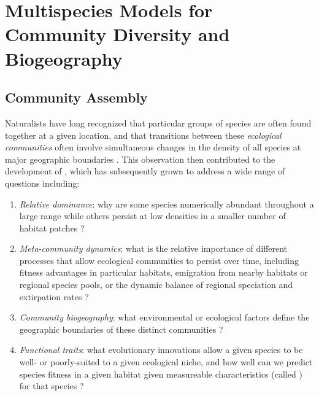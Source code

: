 \chapter{Multispecies Models for Community Diversity and Biogeography}\label{sec:Chap11_joint}

\section{Community Assembly} \label{sec:Chap11_community_assembly}

Naturalists have long recognized that particular groups of species are often found together at a given location, and that transitions between these \textit{ecological communities} often involve simultaneous changes in the density of all species at major geographic boundaries \cite{de_humboldt_ansichten_1808}.  This observation then contributed to the development of  \cite{cowles_ecological_1899}, which has subsequently grown to address a wide range of questions including:
\begin{enumerate}
    \item \textit{Relative dominance}:  why are some species numerically abundant throughout a large range while others persist at low densities in a smaller number of habitat patches \cite{holt_occupancy-abundance_2002}?

    \item \textit{Meta-community dynamics}:  what is the relative importance of different processes that allow ecological communities to persist over time, including fitness advantages in particular habitats, emigration from nearby habitats or regional species pools, or the dynamic balance of regional speciation and extirpation rates \cite{leibold_metacommunity_2004}?

    \item \textit{Community biogeography}:  what environmental or ecological factors define the geographic boundaries of these distinct communities \cite{whittaker_dominance_1965}?

    \item \textit{Functional traits}:  what evolutionary innovations allow a given species to be well- or poorly-suited to a given ecological niche, and how well can we predict species fitness in a given habitat given measureable characteristics (called ) for that species \cite{mcgill_rebuilding_2006}?

\end{enumerate}

